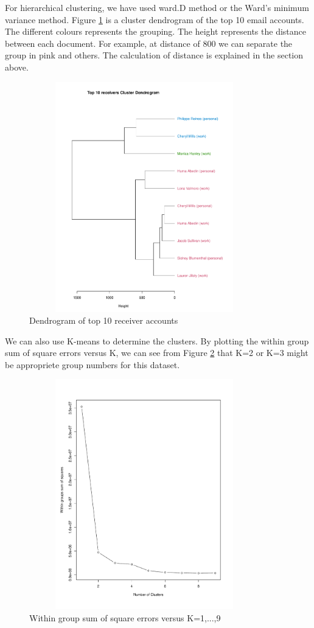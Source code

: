 For hierarchical clustering, we have used ward.D method or the Ward's minimum variance method. Figure \ref{fig:dendr} is a cluster dendrogram of the top 10 email accounts. The different colours represents the grouping. The height represents the distance between each document. For example, at distance of 800 we can separate the group in pink and others. The calculation of distance is explained in the section above.
\begin{figure}[h!]
    \centering
    \includegraphics[width=10cm,height=10cm]
    {daitong_and_yihe/clusterp}
    \caption{Dendrogram of top 10 receiver accounts}
    \label{fig:dendr}
\end{figure}

We can also use K-means to determine the clusters. By plotting the within group sum of square errors versus K, we can see from Figure \ref{fig:determine} that K=2 or K=3 might be appropriete group numbers for this dataset.
\begin{figure}[h!]
    \centering
    \includegraphics[width=10cm,height=10cm]
    {daitong_and_yihe/clusterd}
    \caption{Within group sum of square errors versus K=1,...,9}
    \label{fig:determine}
\end{figure}


